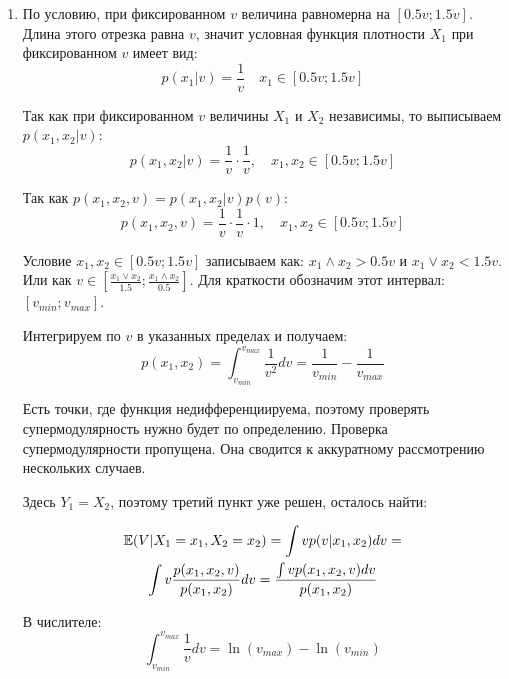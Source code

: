 \begin{enumerate}


\item  По условию, при фиксированном $ v $ величина равномерна на $ [0.5v;1.5v] $. Длина этого отрезка равна $ v $, значит условная функция плотности $ X_{1} $ при фиксированном $ v $ имеет вид:
\begin{equation}
p(x_{1}|v)=\frac{1}{v}\quad x_{1}\in [0.5v;1.5v]
\end{equation}


Так как при фиксированном $ v $ величины $X_{1}  $ и $ X_{2} $ независимы, то выписываем $ p(x_{1},x_{2}|v) $:
\begin{equation}
p(x_{1},x_{2}|v)=\frac{1}{v}\cdot \frac{1}{v}, \quad x_{1},x_{2}\in [0.5v;1.5v]
\end{equation}

Так как $ p(x_{1},x_{2},v)=p(x_{1},x_{2}|v)p(v) $:
\begin{equation}
p(x_{1},x_{2},v)=\frac{1}{v}\cdot \frac{1}{v}\cdot 1, \quad x_{1},x_{2}\in [0.5v;1.5v]
\end{equation}

Условие $ x_{1},x_{2}\in [0.5v;1.5v] $ записываем как: $ x_{1}\wedge x_{2} > 0.5v $ и $ x_{1}\vee x_{2} <1.5v $. Или как $ v\in [\frac{x_{1}\vee x_{2}}{1.5};\frac{x_{1}\wedge x_{2}}{0.5}] $. Для краткости обозначим этот интервал: $ [v_{min};v_{max}] $.

Интегрируем по $ v $ в указанных пределах и получаем:
\begin{equation}
p(x_{1},x_{2})=\int_{v_{min}}^{v_{max}}\frac{1}{v^{2}}dv=\frac{1}{v_{min}}-\frac{1}{v_{max}}
\end{equation}

Есть точки, где функция недифференциируема, поэтому проверять супермодулярность нужно будет по определению. Проверка супермодулярности пропущена. Она сводится к аккуратному рассмотрению нескольких случаев.

Здесь $ Y_{1}=X_{2} $, поэтому третий пункт уже решен, осталось найти:

\begin{multline}
\mathbb{E}(V|X_{1}=x_{1}, X_{2}=x_{2})=\int v p(v|x_{1},x_{2})dv=\\
\int v \frac{p(x_{1},x_{2},v)}{p(x_{1},x_{2})} dv=\frac{\int v p(x_{1},x_{2},v) dv }{p(x_{1},x_{2})}
\end{multline}

В числителе:
\begin{equation}
\int_{v_{min}}^{v_{max}}\frac{1}{v}dv=\ln(v_{max})-\ln(v_{min})
\end{equation}


\end{enumerate}
